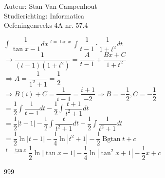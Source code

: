 \documentclass[a4paper]{article}
\begin{document}
  
\noindent \large Auteur: Stan Van Campenhout \\
\noindent \large Studierichting:  Informatica\\
\noindent \large Oefeningenreeks 4A nr. 57.4\\

\medskip

\normalsize

$ \displaystyle\int\dfrac{1}{\tan x-1}dx \stackrel{t = \tan x}{=} \displaystyle\int\dfrac{1}{t-1}\cdot\dfrac{1}{1+t^2}dt $\\

$ \rightarrow \dfrac{1}{\left(t-1\right)\left(1+t^2\right)} = \dfrac{A}{t-1} + \dfrac{Bx + C}{1+t^2} $\\

$ \Rightarrow A = \dfrac{1}{1^2+1} = \dfrac{1}{2} $\\

$ \Rightarrow B\left(i\right) + C = \dfrac{1}{i-1} = \dfrac{i+1}{-2} \Rightarrow B = -\dfrac{1}{2}, C = -\dfrac{1}{2} $\\

$ = \dfrac{1}{2}\displaystyle\int\dfrac{1}{t-1}dt-\dfrac{1}{2}\displaystyle\int\dfrac{t+1}{t^2+1}dt $\\

$ = \dfrac{1}{2}|t-1|-\dfrac{1}{2}\displaystyle\int\dfrac{t}{t^2+1}dt-\dfrac{1}{2}\displaystyle\int\dfrac{1}{t^2+1}dt $\\

$ = \dfrac{1}{2}\ln|t-1|-\dfrac{1}{4}\ln|t^2+1|-\dfrac{1}{2}\operatorname{Bgtan}t + c $\\

 $ \stackrel{t = \tan x}{=}  \dfrac{1}{2}\ln|\tan x-1|-\dfrac{1}{4}\ln|\tan^2x+1|-\dfrac{1}{2}x + c $\\

\begin{thebibliography}{999}
\end{thebibliography}
\end{document}
